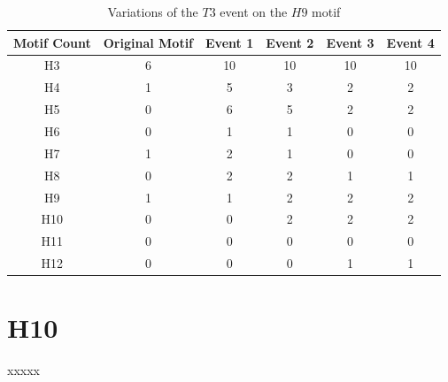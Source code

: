 \begin{table}
    \centering
    \begin{tabular}{||c c c c c c||} 
    \hline
    Motif Count & Original Motif & Event 1 & Event 2 & Event 3 & Event 4 \\ [0.5ex] 
    \hline\hline
    H3 & 6 & 10 & 10 & 10 & 10\\ 
    \hline
    H4 & 1 & 5 & 3 & 2 & 2 \\
    \hline
    H5 & 0 & 6 & 5 & 2 & 2 \\
    \hline
    H6 & 0 & 1 & 1 & 0 & 0 \\
    \hline
    H7 & 1 & 2 & 1 & 0 & 0 \\
    \hline
    H8 & 0 & 2 & 2 & 1 & 1\\
    \hline
    H9 & 1 & 1 & 2 & 2 & 2\\
    \hline
    H10 & 0 & 0 & 2 & 2 & 2\\
    \hline
    H11 & 0 & 0 & 0 & 0 & 0\\
    \hline
    H12 & 0 & 0 & 0 & 1 & 1\\
    \hline
   \end{tabular}
   \caption{Variations of the $T3$ event on the $H9$ motif}
   \label{table:18}
\end{table}

\section{H10}
xxxxx


